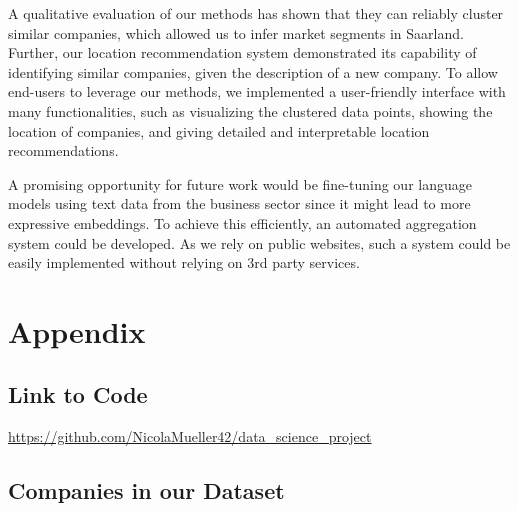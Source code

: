 \documentclass[12pt]{article}
\begin{document}
   A qualitative evaluation of our methods has shown that they can reliably cluster similar companies, which allowed us to infer market segments in Saarland. Further, our location recommendation system demonstrated its capability of identifying similar companies, given the description of a new company. To allow end-users to leverage our methods, we implemented a user-friendly interface with many functionalities, such as visualizing the clustered data points, showing the location of companies, and giving detailed and interpretable location recommendations.
   
   A promising opportunity for future work would be fine-tuning our language models using text data from the business sector since it might lead to more expressive embeddings. To achieve this efficiently, an automated aggregation system could be developed. As we rely on public websites, such a system could be easily implemented without relying on 3rd party services.

    
    
	
	
	\newpage
	\section{Appendix}
	
	\subsection{Link to Code}
	\url{https://github.com/NicolaMueller42/data_science_project}
	
	\subsection{Companies in our Dataset}
	\label{sec:appendix-companies}
	
\end{document}
